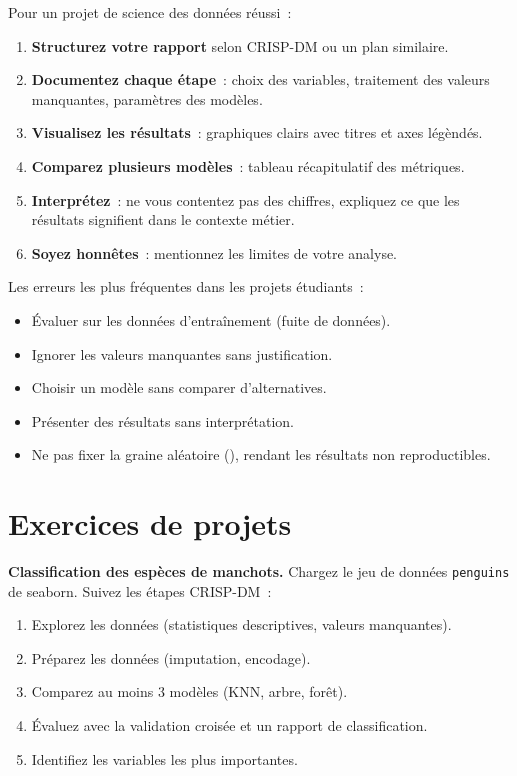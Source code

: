 \begin{bonnepratique}
Pour un projet de science des donn\'ees r\'eussi~:
\begin{enumerate}
    \item \textbf{Structurez votre rapport} selon CRISP-DM ou un plan similaire.
    \item \textbf{Documentez chaque \'etape}~: choix des variables, traitement des valeurs manquantes, param\`etres des mod\`eles.
    \item \textbf{Visualisez les r\'esultats}~: graphiques clairs avec titres et axes l\'eg\`end\'es.
    \item \textbf{Comparez plusieurs mod\`eles}~: tableau r\'ecapitulatif des m\'etriques.
    \item \textbf{Interpr\'etez}~: ne vous contentez pas des chiffres, expliquez ce que les r\'esultats signifient dans le contexte m\'etier.
    \item \textbf{Soyez honn\^etes}~: mentionnez les limites de votre analyse.
\end{enumerate}
\end{bonnepratique}

\begin{attention}
Les erreurs les plus fr\'equentes dans les projets \'etudiants~:
\begin{itemize}
    \item \'Evaluer sur les donn\'ees d'entra\^inement (fuite de donn\'ees).
    \item Ignorer les valeurs manquantes sans justification.
    \item Choisir un mod\`ele sans comparer d'alternatives.
    \item Pr\'esenter des r\'esultats sans interpr\'etation.
    \item Ne pas fixer la graine al\'eatoire (), rendant les r\'esultats non reproductibles.
\end{itemize}
\end{attention}

\section{Exercices de projets}

\begin{exercice}
\textbf{Classification des esp\`eces de manchots.} Chargez le jeu de donn\'ees \texttt{penguins} de seaborn. Suivez les \'etapes CRISP-DM~:
\begin{enumerate}
    \item Explorez les donn\'ees (statistiques descriptives, valeurs manquantes).
    \item Pr\'eparez les donn\'ees (imputation, encodage).
    \item Comparez au moins 3 mod\`eles (KNN, arbre, for\^et).
    \item \'Evaluez avec la validation crois\'ee et un rapport de classification.
    \item Identifiez les variables les plus importantes.
\end{enumerate}
\end{exercice}

